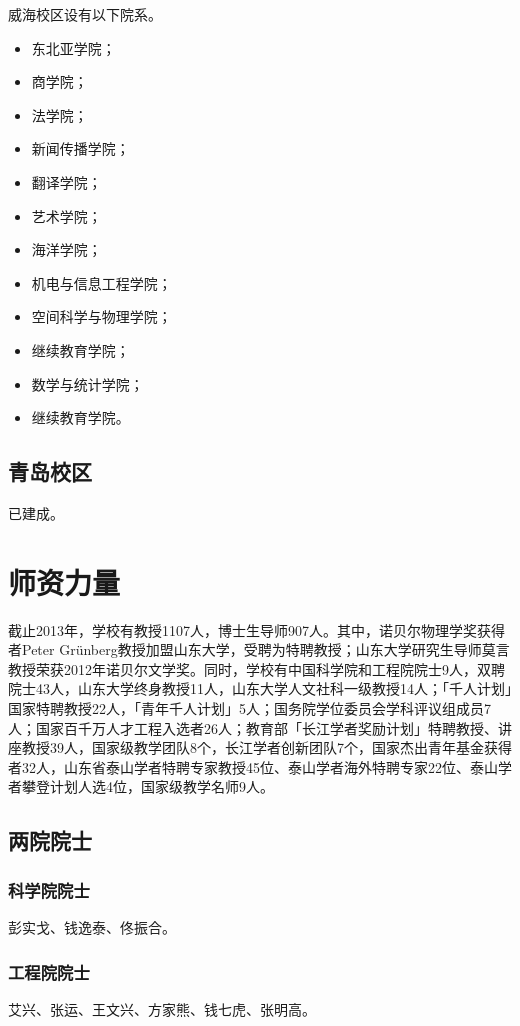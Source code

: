 \documentclass[openany]{sduthesis} %
\begin{document}
威海校区设有以下院系。

\begin{itemize}
  \item 东北亚学院；
  \item 商学院；
  \item 法学院；
  \item 新闻传播学院；
  \item 翻译学院；
  \item 艺术学院；
  \item 海洋学院；
  \item 机电与信息工程学院；
  \item 空间科学与物理学院；
  \item 继续教育学院；
  \item 数学与统计学院；
  \item 继续教育学院。
\end{itemize}

\subsection{青岛校区}

已建成。

\section{师资力量}

截止2013年，学校有教授1107人，博士生导师907人。其中，诺贝尔物理学奖获得者Peter Grünberg教授加盟山东大学，受聘为特聘教授；山东大学研究生导师莫言教授荣获2012年诺贝尔文学奖。同时，学校有中国科学院和工程院院士9人，双聘院士43人，山东大学终身教授11人，山东大学人文社科一级教授14人；「千人计划」国家特聘教授22人，「青年千人计划」5人；国务院学位委员会学科评议组成员7人；国家百千万人才工程入选者26人；教育部「长江学者奖励计划」特聘教授、讲座教授39人，国家级教学团队8个，长江学者创新团队7个，国家杰出青年基金获得者32人，山东省泰山学者特聘专家教授45位、泰山学者海外特聘专家22位、泰山学者攀登计划人选4位，国家级教学名师9人。

\subsection{两院院士}

\subsubsection{科学院院士}彭实戈、钱逸泰、佟振合。

\subsubsection{工程院院士}艾兴、张运、王文兴、方家熊、钱七虎、张明高。
\end{document}
